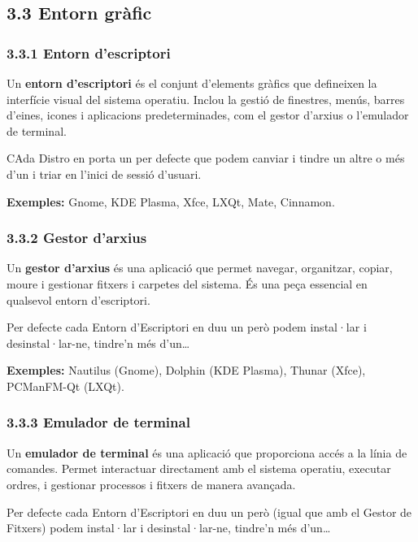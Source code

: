 \documentclass[
  a4paper,
]{article}
\begin{document}
\subsection{3.3 Entorn gràfic}\label{entorn-gruxe0fic}

\subsubsection{3.3.1 Entorn d'escriptori}\label{entorn-descriptori}

Un \textbf{entorn d'escriptori} és el conjunt d'elements gràfics que
defineixen la interfície visual del sistema operatiu. Inclou la gestió
de finestres, menús, barres d'eines, icones i aplicacions
predeterminades, com el gestor d'arxius o l'emulador de terminal.

CAda Distro en porta un per defecte que podem canviar i tindre un altre
o més d'un i triar en l'inici de sessió d'usuari.

\textbf{Exemples:} Gnome, KDE Plasma, Xfce, LXQt, Mate, Cinnamon.

\subsubsection{3.3.2 Gestor d'arxius}\label{gestor-darxius}

Un \textbf{gestor d'arxius} és una aplicació que permet navegar,
organitzar, copiar, moure i gestionar fitxers i carpetes del sistema. És
una peça essencial en qualsevol entorn d'escriptori.

Per defecte cada Entorn d'Escriptori en duu un però podem instal·lar i
desinstal·lar-ne, tindre'n més d'un\ldots{}

\textbf{Exemples:} Nautilus (Gnome), Dolphin (KDE Plasma), Thunar
(Xfce), PCManFM-Qt (LXQt).

\subsubsection{3.3.3 Emulador de terminal}\label{emulador-de-terminal}

Un \textbf{emulador de terminal} és una aplicació que proporciona accés
a la línia de comandes. Permet interactuar directament amb el sistema
operatiu, executar ordres, i gestionar processos i fitxers de manera
avançada.

Per defecte cada Entorn d'Escriptori en duu un però (igual que amb el
Gestor de Fitxers) podem instal·lar i desinstal·lar-ne, tindre'n més
d'un\ldots{}
\end{document}
